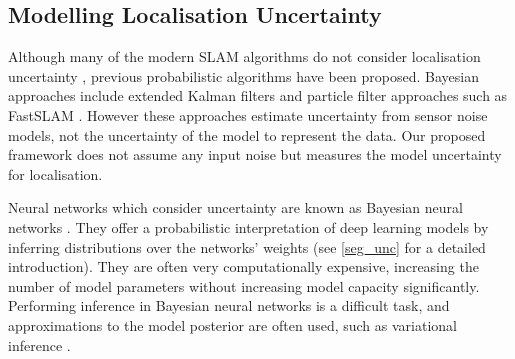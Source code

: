 \subsection{Modelling Localisation Uncertainty}

Although many of the modern SLAM algorithms do not consider localisation uncertainty \citep{klein2007parallel,engel2014lsd,li2012worldwide}, previous probabilistic algorithms have been proposed. Bayesian approaches include extended Kalman filters and particle filter approaches such as FastSLAM \citep{thrun2005probabilistic}. However these approaches estimate uncertainty from sensor noise models, not the uncertainty of the model to represent the data. Our proposed framework does not assume any input noise but measures the model uncertainty for localisation.

Neural networks which consider uncertainty are known as Bayesian neural networks \citep{denker1991transforming,mackay1992practical}. They offer a probabilistic interpretation of deep learning models by inferring distributions over the networks’ weights (see \cref{seg_unc} for a detailed introduction). They are often very computationally expensive, increasing the number of model parameters without increasing model capacity significantly. Performing inference in Bayesian neural networks is a difficult task, and approximations to the model posterior are often used, such as variational inference \citep{graves2011practical}.


